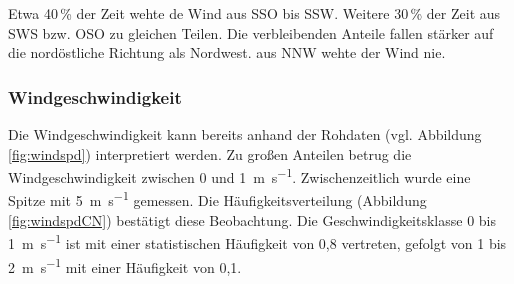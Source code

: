 Etwa 40\,\% der Zeit wehte de Wind aus SSO bis SSW. Weitere 30\,\% der Zeit aus SWS bzw. OSO zu gleichen Teilen. Die verbleibenden Anteile fallen stärker auf die nordöstliche Richtung als Nordwest. aus NNW wehte der Wind nie.
\subsubsection{Windgeschwindigkeit}
Die Windgeschwindigkeit kann bereits anhand der Rohdaten (vgl. Abbildung \ref{fig:windspd}) interpretiert werden. Zu großen Anteilen betrug die Windgeschwindigkeit zwischen 0 und \SI{1}{\meter\per\second}. Zwischenzeitlich wurde eine Spitze mit \SI{5}{\meter\per\second} gemessen. Die Häufigkeitsverteilung (Abbildung \ref{fig:windspdCN}) bestätigt diese Beobachtung. Die Geschwindigkeitsklasse 0 bis \SI{1}{\meter\per\second} ist mit einer statistischen Häufigkeit von 0,8 vertreten, gefolgt von 1 bis \SI{2}{\meter\per\second} mit einer Häufigkeit von 0,1.
